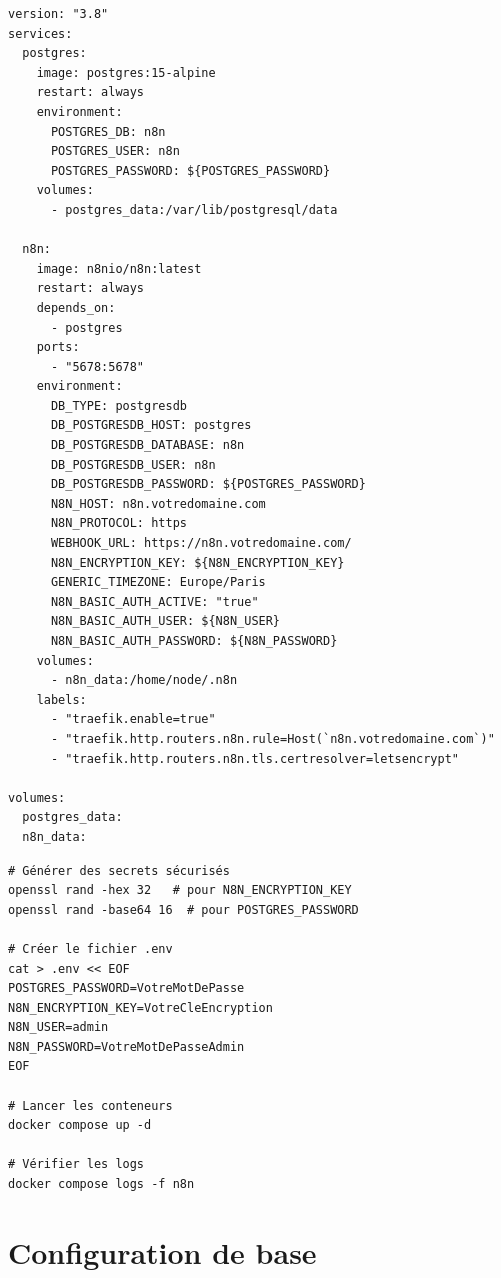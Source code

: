 \documentclass[11pt, a4paper]{article}
\begin{document}
\begin{lstlisting}[style=yamlstyle, caption={docker-compose.yml — n8n + PostgreSQL}]
version: "3.8"
services:
  postgres:
    image: postgres:15-alpine
    restart: always
    environment:
      POSTGRES_DB: n8n
      POSTGRES_USER: n8n
      POSTGRES_PASSWORD: ${POSTGRES_PASSWORD}
    volumes:
      - postgres_data:/var/lib/postgresql/data

  n8n:
    image: n8nio/n8n:latest
    restart: always
    depends_on:
      - postgres
    ports:
      - "5678:5678"
    environment:
      DB_TYPE: postgresdb
      DB_POSTGRESDB_HOST: postgres
      DB_POSTGRESDB_DATABASE: n8n
      DB_POSTGRESDB_USER: n8n
      DB_POSTGRESDB_PASSWORD: ${POSTGRES_PASSWORD}
      N8N_HOST: n8n.votredomaine.com
      N8N_PROTOCOL: https
      WEBHOOK_URL: https://n8n.votredomaine.com/
      N8N_ENCRYPTION_KEY: ${N8N_ENCRYPTION_KEY}
      GENERIC_TIMEZONE: Europe/Paris
      N8N_BASIC_AUTH_ACTIVE: "true"
      N8N_BASIC_AUTH_USER: ${N8N_USER}
      N8N_BASIC_AUTH_PASSWORD: ${N8N_PASSWORD}
    volumes:
      - n8n_data:/home/node/.n8n
    labels:
      - "traefik.enable=true"
      - "traefik.http.routers.n8n.rule=Host(`n8n.votredomaine.com`)"
      - "traefik.http.routers.n8n.tls.certresolver=letsencrypt"

volumes:
  postgres_data:
  n8n_data:
\end{lstlisting}

\begin{lstlisting}[style=terminal, caption={Démarrage et vérification}]
# Générer des secrets sécurisés
openssl rand -hex 32   # pour N8N_ENCRYPTION_KEY
openssl rand -base64 16  # pour POSTGRES_PASSWORD

# Créer le fichier .env
cat > .env << EOF
POSTGRES_PASSWORD=VotreMotDePasse
N8N_ENCRYPTION_KEY=VotreCleEncryption
N8N_USER=admin
N8N_PASSWORD=VotreMotDePasseAdmin
EOF

# Lancer les conteneurs
docker compose up -d

# Vérifier les logs
docker compose logs -f n8n
\end{lstlisting}

\section{Configuration de base}
\end{document}
